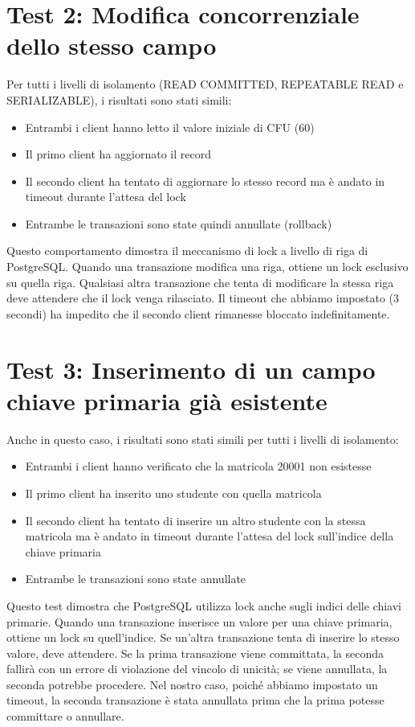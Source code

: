 \documentclass[a4paper,12pt]{report}
\begin{document}
\section{Test 2: Modifica concorrenziale dello stesso campo}
Per tutti i livelli di isolamento (READ COMMITTED, REPEATABLE READ e SERIALIZABLE), i risultati sono stati simili:
\begin{itemize}
    \item Entrambi i client hanno letto il valore iniziale di CFU (60)
    \item Il primo client ha aggiornato il record
    \item Il secondo client ha tentato di aggiornare lo stesso record ma è andato in timeout durante l'attesa del lock
    \item Entrambe le transazioni sono state quindi annullate (rollback)
\end{itemize}

Questo comportamento dimostra il meccanismo di lock a livello di riga di PostgreSQL. Quando una transazione modifica una riga, ottiene un lock esclusivo su quella riga. Qualsiasi altra transazione che tenta di modificare la stessa riga deve attendere che il lock venga rilasciato. Il timeout che abbiamo impostato (3 secondi) ha impedito che il secondo client rimanesse bloccato indefinitamente.

\section{Test 3: Inserimento di un campo chiave primaria già esistente}
Anche in questo caso, i risultati sono stati simili per tutti i livelli di isolamento:
\begin{itemize}
    \item Entrambi i client hanno verificato che la matricola 20001 non esistesse
    \item Il primo client ha inserito uno studente con quella matricola
    \item Il secondo client ha tentato di inserire un altro studente con la stessa matricola ma è andato in timeout durante l'attesa del lock sull'indice della chiave primaria
    \item Entrambe le transazioni sono state annullate
\end{itemize}

Questo test dimostra che PostgreSQL utilizza lock anche sugli indici delle chiavi primarie. Quando una transazione inserisce un valore per una chiave primaria, ottiene un lock su quell'indice. Se un'altra transazione tenta di inserire lo stesso valore, deve attendere. Se la prima transazione viene committata, la seconda fallirà con un errore di violazione del vincolo di unicità; se viene annullata, la seconda potrebbe procedere. Nel nostro caso, poiché abbiamo impostato un timeout, la seconda transazione è stata annullata prima che la prima potesse committare o annullare.
\end{document}
